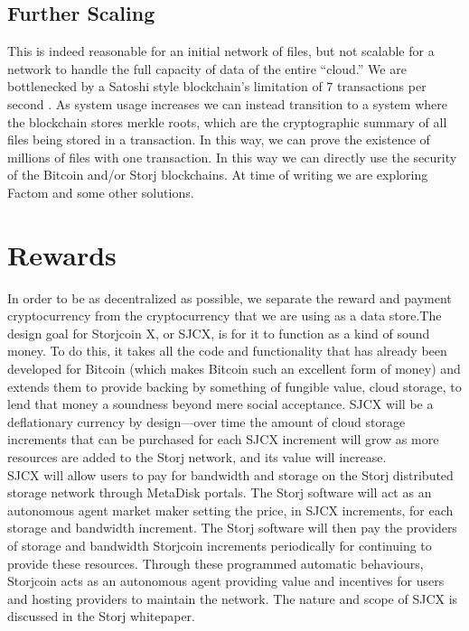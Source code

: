 \documentclass[a4paper,10pt]{article}
\begin{document}
\subsection{Further Scaling}

This is indeed reasonable for an initial network of files, but not scalable for a network to handle the full capacity of data of the entire “cloud.” We are bottlenecked by a Satoshi style blockchain’s limitation of 7 transactions per second \cite{13}. As system usage increases we can instead transition to a system where the blockchain stores merkle roots, which are the cryptographic summary of all files being stored in a transaction. In this way, we can prove the existence of millions of files with one transaction. In this way we can directly use the security of the Bitcoin and/or Storj blockchains. At time of writing we are exploring Factom \cite{14} and some other solutions. 

\section{Rewards}

In order to be as decentralized as possible, we separate the reward and payment cryptocurrency from the cryptocurrency that we are using as a data store.The design goal for Storjcoin X, or SJCX, is for it to function as a kind of sound money. To do this, it takes all the code and functionality that has already been developed for Bitcoin (which makes Bitcoin such an excellent form of money) and extends them to provide backing by something of fungible value, cloud storage, to lend that money a soundness beyond mere social acceptance. SJCX will be a deflationary currency by design—over time the amount of cloud storage increments that can be purchased for each SJCX increment will grow as more resources are added to the Storj network, and its value will increase.\\

SJCX will allow users to pay for bandwidth and storage on the Storj distributed storage network through MetaDisk portals. The Storj software will act as an autonomous agent market maker setting the price, in SJCX increments, for each storage and bandwidth increment. The Storj software will then pay the providers of storage and bandwidth Storjcoin increments periodically for continuing to provide these resources. Through these programmed automatic behaviours, Storjcoin acts as an autonomous agent providing value and incentives for users and hosting providers to maintain the network. The nature and scope of SJCX is discussed in the Storj whitepaper.
\end{document}
